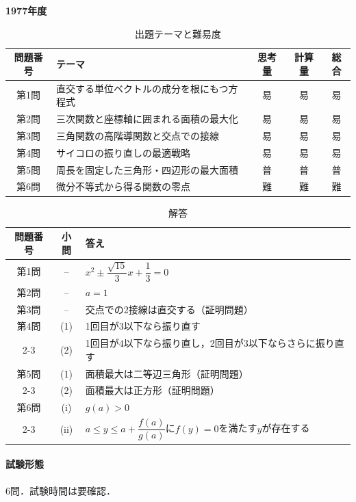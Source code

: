\documentclass[../../main.tex]{subfiles}
\begin{document}
\begin{center}
  {\fontsize{48pt}{58pt}\selectfont \textbf{1977}\normalsize\textbf{年度}}
\end{center}

\begin{table}[htb]
  \centering
  \caption{出題テーマと難易度}
  \begin{tabular}{|c|p{6.2cm}|c|c|c|}
    \hline
    \textbf{問題番号} & \textbf{テーマ} & \textbf{思考量} & \textbf{計算量} & \textbf{総合} \\
    \hline
    第1問 & 直交する単位ベクトルの成分を根にもつ方程式 & 易 & 易 & 易 \\
    \hline
    第2問 & 三次関数と座標軸に囲まれる面積の最大化 & 易 & 易 & 易 \\
    \hline
    第3問 & 三角関数の高階導関数と交点での接線 & 易 & 易 & 易 \\
    \hline
    第4問 & サイコロの振り直しの最適戦略 & 易 & 易 & 易 \\
    \hline
    第5問 & 周長を固定した三角形・四辺形の最大面積 & 普 & 普 & 普 \\
    \hline
    第6問 & 微分不等式から得る関数の零点 & 難 & 難 & 難 \\
    \hline
  \end{tabular}
\end{table}

\begin{table}[htb]
  \centering
  \caption{解答}
  \renewcommand{\arraystretch}{1.4}
  \begin{tabular}{|c|c|p{9cm}|}
    \hline
    \textbf{問題番号} & \textbf{小問} & \textbf{答え} \\
    \hline
    第1問 & -- & $x^2\pm\dfrac{\sqrt{15}}{3}x+\dfrac{1}{3}=0$ \\
    \hline
    第2問 & -- & $a=1$ \\
    \hline
    第3問 & -- & 交点での2接線は直交する（証明問題） \\
    \hline
    第4問 & (1) & 1回目が$3$以下なら振り直す \\
    \cline{2-3}
    & (2) & 1回目が$4$以下なら振り直し，2回目が$3$以下ならさらに振り直す \\
    \hline
    第5問 & (1) & 面積最大は二等辺三角形（証明問題） \\
    \cline{2-3}
    & (2) & 面積最大は正方形（証明問題） \\
    \hline
    第6問 & (i) & $g(a)>0$ \\
    \cline{2-3}
    & (ii) & $a\le y\le a+\dfrac{f(a)}{g(a)}$に$f(y)=0$を満たす$y$が存在する \\
    \hline
  \end{tabular}
\end{table}

\paragraph{試験形態}
6問．試験時間は要確認．
\end{document}
